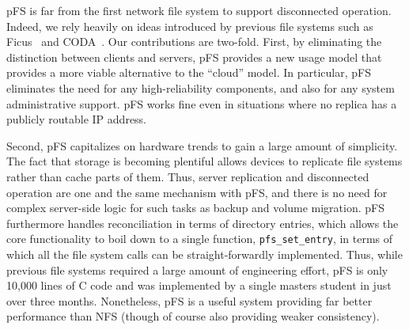 pFS is far from the first network file system to support disconnected
operation.  Indeed, we rely heavily on ideas introduced by previous
file systems such as Ficus~\cite{page:ficus} and
CODA~\cite{kistler:coda}.  Our contributions are two-fold.  First, by
eliminating the distinction between clients and servers, pFS provides
a new usage model that provides a more viable alternative to the
``cloud'' model.  In particular, pFS eliminates the need for any
high-reliability components, and also for any system administrative
support.  pFS works fine even in situations where no replica has a
publicly routable IP address.

Second, pFS capitalizes on hardware trends to gain a large amount of
simplicity.  The fact that storage is becoming plentiful allows
devices to replicate file systems rather than cache parts of them.
Thus, server replication and disconnected operation are one and the
same mechanism with pFS, and there is no need for complex server-side
logic for such tasks as backup and volume migration.  pFS furthermore
handles reconciliation in terms of directory entries, which allows the
core functionality to boil down to a single function,
\texttt{pfs\_set\_entry}, in terms of which all the file system calls
can be straight-forwardly implemented.  Thus, while previous file
systems required a large amount of engineering effort, pFS is only
10,000 lines of C code and was implemented by a single masters student
in just over three months.  Nonetheless, pFS is a useful system
providing far better performance than NFS (though of course also
providing weaker consistency).


